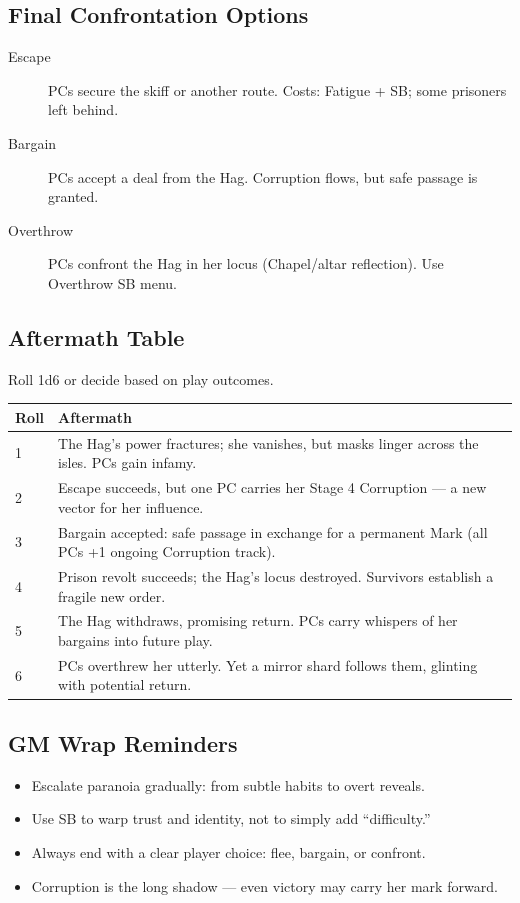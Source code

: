 \documentclass[11pt]{article}
\begin{document}
\subsection{Final Confrontation Options}
\begin{description}
  \item[Escape] PCs secure the skiff or another route. Costs: Fatigue + SB; some prisoners left behind.  
  \item[Bargain] PCs accept a deal from the Hag. Corruption flows, but safe passage is granted.  
  \item[Overthrow] PCs confront the Hag in her locus (Chapel/altar reflection). Use Overthrow SB menu.  
\end{description}

\subsection{Aftermath Table}
Roll 1d6 or decide based on play outcomes.
\begin{longtable}{@{}p{2cm}p{13cm}@{}}
\toprule
\textbf{Roll} & \textbf{Aftermath} \\
\midrule
1 & The Hag's power fractures; she vanishes, but masks linger across the isles. PCs gain infamy. \\
2 & Escape succeeds, but one PC carries her Stage 4 Corruption --- a new vector for her influence. \\
3 & Bargain accepted: safe passage in exchange for a permanent Mark (all PCs +1 ongoing Corruption track). \\
4 & Prison revolt succeeds; the Hag's locus destroyed. Survivors establish a fragile new order. \\
5 & The Hag withdraws, promising return. PCs carry whispers of her bargains into future play. \\
6 & PCs overthrew her utterly. Yet a mirror shard follows them, glinting with potential return. \\
\bottomrule
\end{longtable}

\subsection{GM Wrap Reminders}
\begin{itemize}
  \item Escalate paranoia gradually: from subtle habits to overt reveals.
  \item Use SB to warp trust and identity, not to simply add ``difficulty.''
  \item Always end with a clear player choice: flee, bargain, or confront.
  \item Corruption is the long shadow --- even victory may carry her mark forward.
\end{itemize}
\end{document}
